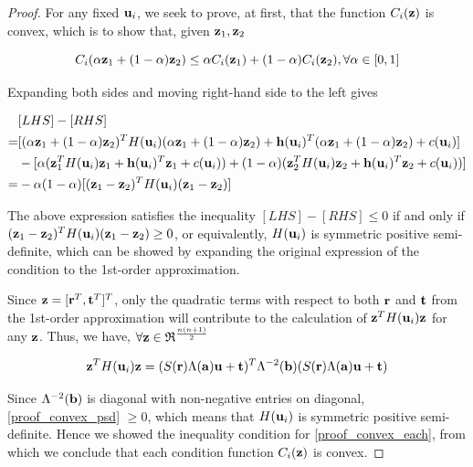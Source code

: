 \documentclass{article}
\begin{document}
\begin{enumerate}
\begin{enumerate}
\begin{proof}
For any fixed ${\bf u}_i$, we seek to prove, at first, that the function $C_i({\bf z})$ is convex, which is to show that, given ${\bf z}_1, {\bf z}_2$

\begin{equation}
\label{proof_convex_ineq}
C_i(\alpha {\bf z}_1 + (1-\alpha) {\bf z}_2) \leq \alpha C_i({\bf z}_1) + (1-\alpha) C_i({\bf z}_2),  \forall  \alpha \in [0,1]
\end{equation}

Expanding both sides and moving right-hand side to the left gives

\begin{equation}
\label{proof_convex_each}
\begin{aligned}
& [LHS]-[RHS] \\
=& [(\alpha {\bf z}_1 + (1-\alpha) {\bf z}_2)^T H({\bf u}_i) (\alpha {\bf z}_1 + (1-\alpha) {\bf z}_2) + {\bf h}({\bf u}_i)^T (\alpha {\bf z}_1 + (1-\alpha) {\bf z}_2) + c({\bf u}_i)]\\
& - [\alpha ({\bf z}_1^T H({\bf u}_i) {\bf z}_1 + {\bf h}({\bf u}_i)^T {\bf z}_1 + c({\bf u}_i)) + (1-\alpha)({\bf z}_2^T H({\bf u}_i) {\bf z}_2 + {\bf h}({\bf u}_i)^T {\bf z}_2 + c({\bf u}_i))] \\
=& -\alpha(1-\alpha) [({\bf z}_1 - {\bf z}_2)^T H({\bf u}_i) ({\bf z}_1 - {\bf z}_2)]
\end{aligned}
\end{equation}

The above expression satisfies the inequality $[LHS]-[RHS] \leq 0$ if and only if $({\bf z}_1 - {\bf z}_2)^T H({\bf u}_i) ({\bf z}_1 - {\bf z}_2) \geq 0$, or equivalently, $H({\bf u}_i)$ is symmetric positive semi-definite, which can be showed by expanding the original expression of the condition to the 1st-order approximation.

Since ${\bf z} = [{\bf r}^T, {\bf t}^T]^T$, only the quadratic terms with respect to both ${\bf r}$ and ${\bf t}$ from the 1st-order approximation will contribute to the calculation of ${\bf z}^T H({\bf u}_i) {\bf z}$ for any ${\bf z}$. Thus, we have, $\forall {\bf z} \in \mathfrak{R}^{\frac{n(n+1)}{2}}$

\begin{equation}
\label{proof_convex_psd}
{\bf z}^T H({\bf u}_i) {\bf z} = (S({\bf r}) \Lambda({\bf a}) {\bf u} + {\bf t})^T \Lambda^{-2}({\bf b}) (S({\bf r}) \Lambda({\bf a}) {\bf u} + {\bf t})
\end{equation}

Since $\Lambda^{-2}({\bf b})$ is diagonal with non-negative entries on diagonal, \eqref{proof_convex_psd} $\geq 0$, which means that $H({\bf u}_i)$ is symmetric positive semi-definite. Hence we showed the inequality condition for \eqref{proof_convex_each}, from which we conclude that each condition function $C_i({\bf z})$ is convex.


\end{proof}
\end{enumerate}
\end{enumerate}
\end{document}
